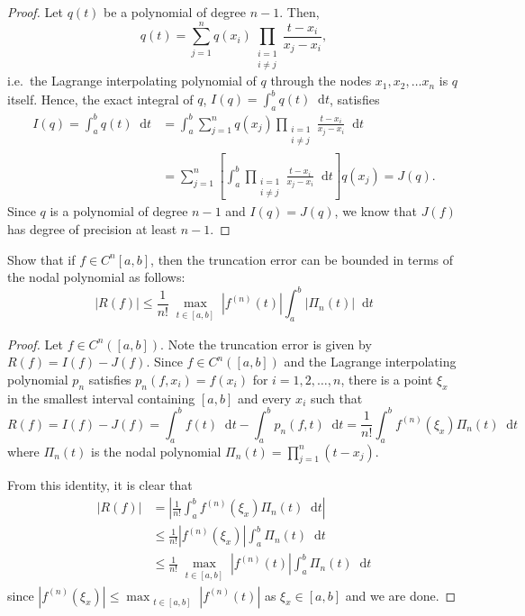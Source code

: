 \documentclass[12pt]{article}
\theoremstyle{definition}
\newenvironment{custompbm}[1]
  {\renewcommand\theproblem{#1}\problem}
  {\endproblem}
\newcommand*\diff{\mathop{}\!\mathrm{d}}
\begin{document}
\begin{proof}
  Let $q(t)$ be a polynomial of degree $n-1$. Then,
  \[
    q(t) = \sum_{j=1}^n q(x_i) \prod_{\substack{i=1\\i\neq j}} \frac{t - x_i}{x_j - x_i},
  \]
  i.e.\ the Lagrange interpolating polynomial of $q$ through the nodes $x_1, x_2, \dots x_n$ is $q$ itself.
  Hence, the exact integral of $q$, $I(q) = \int_a^b q(t) \diff{t}$, satisfies
  \begin{align*}
    I(q) = \int_a^b q(t) \diff{t}
    &= \int_a^b \sum_{j=1}^{n} q(x_j) \prod_{\substack{i=1\\i\neq j}} \frac{t - x_i}{x_j - x_i} \diff{t} \\
    &= \sum_{j=1}^{n} \left[\int_a^b \prod_{\substack{i=1\\i\neq j}} \frac{t - x_i}{x_j - x_i} \diff{t} \right] q(x_j) = J(q).
  \end{align*}
  Since $q$ is a polynomial of degree $n-1$ and $I(q) = J(q)$, we know that $J(f)$
  has degree of precision at least $n-1$.
\end{proof}


\begin{custompbm}{9.1.3}
  Show that if $f \in C^n [a,b]$, then the truncation error can be bounded
  in terms of the nodal polynomial as follows:
  \[
    |R(f)| \leq \frac{1}{n!} \max_{\substack{t\in [a,b]}} |f^{(n)}(t)| \int_a^b |\Pi_n(t)| \diff{t}
  \]
\end{custompbm}

\begin{proof}
  Let $f \in C^n([a,b])$. Note the truncation error is given by $R(f) = I(f) - J(f)$. Since
  $f \in C^n([a,b])$ and the Lagrange interpolating polynomial $p_n$ satisfies
  $p_n(f, x_i) = f(x_i)$ for $i=1,2,\dots,n$, there is a point $\xi_x$ in the smallest
  interval containing $[a, b]$ and every $x_i$ such that
  \[
    R(f) = I(f) - J(f) = \int_a^b f(t) \diff{t} - \int_a^b p_n(f, t) \diff{t} = \frac{1}{n!} \int_a^b f^{(n)}(\xi_x) \Pi_n(t) \diff{t}
  \]
  where $\Pi_n(t)$ is the nodal polynomial $\Pi_n(t) = \prod_{j=1}^n (t-x_j)$.

  From this identity, it is clear that
  \begin{align*}
    |R(f)| &= \left|\frac{1}{n!} \int_a^b f^{(n)}\left(\xi_x\right) \Pi_n(t) \diff{t}\right|\\
    &\leq \frac{1}{n!} \left|f^{(n)}\left(\xi_x\right) \right| \int_a^b \Pi_n(t) \diff{t}\\
    &\leq \frac{1}{n!} \max_{\substack{t\in [a,b]}}\left|f^{(n)}(t)\right| \int_a^b \Pi_n(t) \diff{t}
  \end{align*}
  since $\left|f^{(n)}(\xi_x)\right| \leq \max_{\substack{t\in [a,b]}}\left|f^{(n)}(t)\right|$ as $\xi_x \in [a,b]$
  and we are done.
\end{proof}
\end{document}
